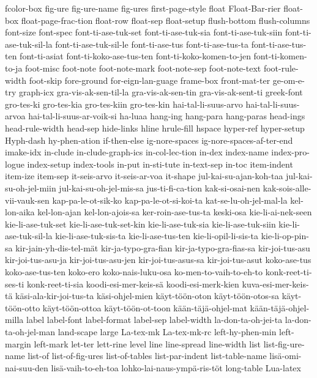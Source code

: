 {fcolor-box
fig-ure
fig-ure-name
fig-ures
first-page-style
float
Float-Bar-rier
float-box
float-page-frac-tion
float-row
float-sep
float-setup
flush-bottom
flush-columns
font-size
font-spec
font-ti-ase-tuk-set
font-ti-ase-tuk-sia
font-ti-ase-tuk-siin
font-ti-ase-tuk-sil-la
font-ti-ase-tuk-sil-le
font-ti-ase-tus
font-ti-ase-tus-ta
font-ti-ase-tus-ten
font-ti-asiat
font-ti-koko-ase-tus-ten
font-ti-koko-komen-to-jen
font-ti-komen-to-ja
foot-misc
foot-note
foot-note-mark
foot-note-sep
foot-note-text
foot-rule-width
foot-skip
fore-ground
for-eign-lan-guage
frame-box
front-mat-ter
ge-om-e-try
graph-icx
gra-vis-ak-sen-til-la
gra-vis-ak-sen-tin
gra-vis-ak-sent-ti
greek-font
gro-tes-ki
gro-tes-kia
gro-tes-kiin
gro-tes-kin
hai-tal-li-suus-arvo
hai-tal-li-suus-arvoa
hai-tal-li-suus-ar-voik-si
ha-luaa
hang-ing
hang-para
hang-paras
head-ings
head-rule-width
head-sep
hide-links
hline
hrule-fill
hspace
hyper-ref
hyper-setup
Hyph-dash
hy-phen-ation
if-then-else
ig-nore-spaces
ig-nore-spaces-af-ter-end
imake-idx
in-clude
in-clude-graph-ics
in-col-lec-tion
in-dex
index-name
index-pro-logue
index-setup
index-tools
in-put
in-sti-tute
in-text-sep
in-toc
item-indent
item-ize
item-sep
it-seis-arvo
it-seis-ar-voa
it-shape
jul-kai-su-ajan-koh-taa
jul-kai-su-oh-jel-miin
jul-kai-su-oh-jel-mis-sa
jus-ti-fi-ca-tion
kak-si-osai-nen
kak-sois-alle-vii-vauk-sen
kap-pa-le-ot-sik-ko
kap-pa-le-ot-si-koi-ta
kat-se-lu-oh-jel-mal-la
kel-lon-aika
kel-lon-ajan
kel-lon-ajois-sa
ker-roin-ase-tus-ta
keski-osa
kie-li-ai-nek-seen
kie-li-ase-tuk-set
kie-li-ase-tuk-set-kin
kie-li-ase-tuk-sia
kie-li-ase-tuk-siin
kie-li-ase-tuk-sil-la
kie-li-ase-tuk-sis-ta
kie-li-ase-tus-ten
kie-li-opil-li-sis-ta
kie-li-op-pin-sa
kir-jain-yh-dis-tel-mät
kir-ja-typo-gra-fian
kir-ja-typo-gra-fias-sa
kir-joi-tus-asu
kir-joi-tus-asu-ja
kir-joi-tus-asu-jen
kir-joi-tus-asus-sa
kir-joi-tus-asut
koko-ase-tus
koko-ase-tus-ten
koko-ero
koko-nais-luku-osa
ko-men-to-vaih-to-eh-to
konk-reet-ti-ses-ti
konk-reet-ti-sia
koodi-esi-mer-keis-sä
koodi-esi-merk-kien
kuva-esi-mer-keis-tä
käsi-ala-kir-joi-tus-ta
käsi-ohjel-mien
käyt-töön-oton
käyt-töön-otos-sa
käyt-töön-otto
käyt-töön-ottoa
käyt-töön-ot-toon
kään-täjä-ohjel-mat
kään-täjä-ohjel-milla
label
label-font
label-format
label-sep
label-width
la-don-ta-oh-jei-ta
la-don-ta-oh-jel-man
land-scape
large
La-tex-mk
La-tex-mk-rc
left-hy-phen-min
left-margin
left-mark
let-ter
lett-rine
level
line
line-spread
line-width
list
list-fig-ure-name
list-of
list-of-fig-ures
list-of-tables
list-par-indent
list-table-name
lisä-omi-nai-suu-den
lisä-vaih-to-eh-toa
lohko-lai-naus-ympä-ris-töt
long-table
Lua-latex
}
